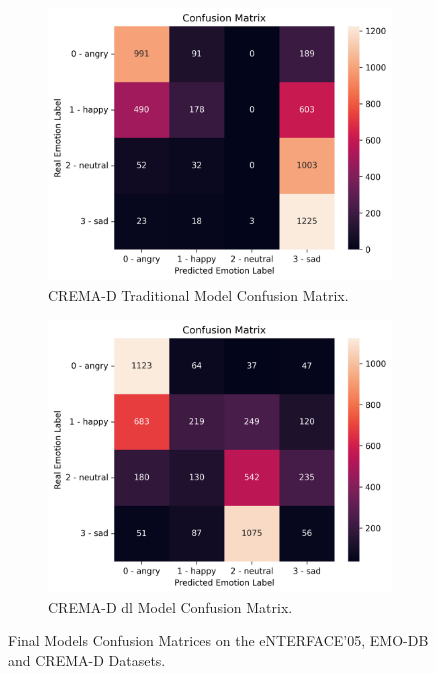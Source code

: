 \begin{figure}
	\begin{subfigure}{.5\textwidth}
		\centering
		\includegraphics[width=\linewidth]{figs/4_5_discussion/cre_trad_cm.png}
		\caption{CREMA-D Traditional Model Confusion Matrix.}
	\end{subfigure}%
	\begin{subfigure}{.5\textwidth}
		\centering
		\includegraphics[width=\linewidth]{figs/4_5_discussion/cre_deep_cm.png}
		\caption{CREMA-D \ac{dl} Model Confusion Matrix.}
	\end{subfigure}
	\caption{Final Models Confusion Matrices on the eNTERFACE'05, EMO-DB and CREMA-D Datasets.}
	\label{fig:final_cm}
\end{figure}

